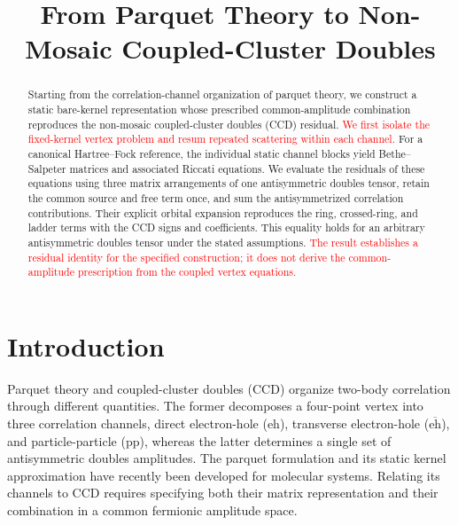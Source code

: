 \documentclass[aip,jcp,reprint,noshowkeys,superscriptaddress]{revtex4-1}
\newcommand{\titou}[1]{\textcolor{red}{#1}}
\newcommand{\eh}{\text{eh}}
\newcommand{\teh}{{\overline{\text{eh}}}}
\newcommand{\pp}{\text{pp}}
\newcommand{\LCPQ}{Univ Toulouse, CNRS, Laboratoire de Chimie et Physique Quantiques, Toulouse, France}
\begin{document}
\title{From Parquet Theory to Non-Mosaic Coupled-Cluster Doubles}



\begin{abstract}
Starting from the correlation-channel organization of parquet theory, we
construct a static bare-kernel representation whose prescribed
common-amplitude combination reproduces the non-mosaic coupled-cluster
doubles (CCD) residual. \titou{We first isolate the fixed-kernel vertex problem
and resum repeated scattering within each channel.}
For a canonical Hartree--Fock reference, the individual static channel
blocks yield Bethe--Salpeter matrices and associated Riccati equations.
We evaluate the residuals of these equations using three matrix
arrangements of one antisymmetric doubles tensor, retain the common source
and free term once, and sum the antisymmetrized correlation contributions.
Their explicit orbital expansion reproduces the ring, crossed-ring, and
ladder terms with the CCD signs and coefficients. This equality holds for
an arbitrary antisymmetric doubles tensor under the stated assumptions.
\titou{The result establishes a residual identity for the specified construction;
it does not derive the common-amplitude prescription from the coupled
vertex equations.}
\end{abstract}

\maketitle

\section{Introduction}
\label{sec:introduction}

Parquet theory and coupled-cluster doubles (CCD) organize two-body correlation
through different quantities. The former decomposes a four-point vertex into
three correlation channels, direct electron-hole ($\eh$), transverse electron-hole
($\teh$), and particle-particle ($\pp$), whereas the latter determines a single set of
antisymmetric doubles amplitudes. The parquet formulation and its static
kernel approximation have recently been developed for molecular
systems.\cite{Marie2025} Relating its channels to CCD requires specifying
both their matrix representation and their combination in a common
fermionic amplitude space.
\end{document}
